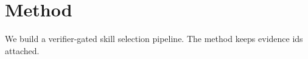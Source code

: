 \section{Method}
We build a verifier-gated skill selection pipeline. The method keeps evidence ids attached.
